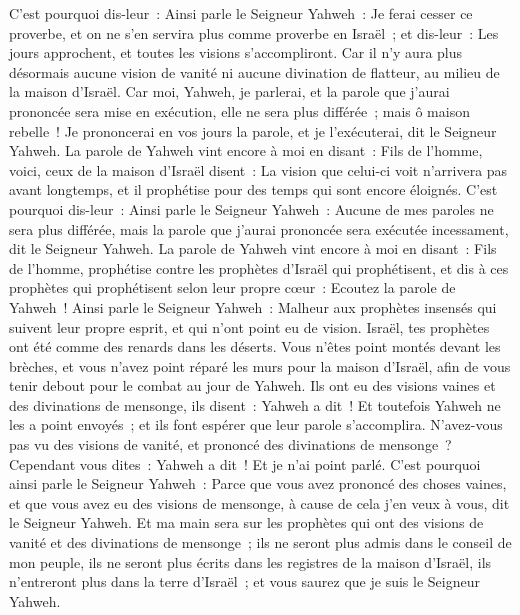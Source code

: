 \begin{multicols}{2}
C'est pourquoi dis-leur~: Ainsi parle le Seigneur Yahweh~: Je ferai cesser ce proverbe, et on ne s'en servira plus comme proverbe en Israël~; et dis-leur~: Les jours approchent, et toutes les visions s'accompliront.
Car il n'y aura plus désormais aucune vision de vanité ni aucune divination de flatteur, au milieu de la maison d'Israël.
Car moi, Yahweh, je parlerai, et la parole que j'aurai prononcée sera mise en exécution, elle ne sera plus différée~; mais ô maison rebelle~! Je prononcerai en vos jours la parole, et je l'exécuterai, dit le Seigneur Yahweh.
La parole de Yahweh vint encore à moi en disant~:
Fils de l'homme, voici, ceux de la maison d'Israël disent~: La vision que celui-ci voit n'arrivera pas avant longtemps, et il prophétise pour des temps qui sont encore éloignés.
C'est pourquoi dis-leur~: Ainsi parle le Seigneur Yahweh~: Aucune de mes paroles ne sera plus différée, mais la parole que j'aurai prononcée sera exécutée incessament, dit le Seigneur Yahweh.
\VerseOne{}La parole de Yahweh vint encore à moi en disant~:
Fils de l'homme, prophétise contre les prophètes d'Israël qui prophétisent, et dis à ces prophètes qui prophétisent selon leur propre cœur~: Ecoutez la parole de Yahweh~!
Ainsi parle le Seigneur Yahweh~: Malheur aux prophètes insensés qui suivent leur propre esprit, et qui n'ont point eu de vision.
Israël, tes prophètes ont été comme des renards dans les déserts.
Vous n'êtes point montés devant les brèches, et vous n'avez point réparé les murs pour la maison d'Israël, afin de vous tenir debout pour le combat au jour de Yahweh.
Ils ont eu des visions vaines et des divinations de mensonge, ils disent~: Yahweh a dit~! Et toutefois Yahweh ne les a point envoyés~; et ils font espérer que leur parole s'accomplira.
N'avez-vous pas vu des visions de vanité, et prononcé des divinations de mensonge~? Cependant vous dites~: Yahweh a dit~! Et je n'ai point parlé.
C'est pourquoi ainsi parle le Seigneur Yahweh~: Parce que vous avez prononcé des choses vaines, et que vous avez eu des visions de mensonge, à cause de cela j'en veux à vous, dit le Seigneur Yahweh.
Et ma main sera sur les prophètes qui ont des visions de vanité et des divinations de mensonge~; ils ne seront plus admis dans le conseil de mon peuple, ils ne seront plus écrits dans les registres de la maison d'Israël, ils n'entreront plus dans la terre d'Israël~; et vous saurez que je suis le Seigneur Yahweh.

\end{multicols}
